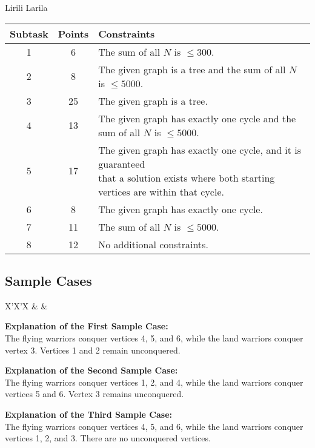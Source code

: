 \begin{statement}[
  problempoints=100,
  timelimit=2 seconds,
  memorylimit=512 MiB,
]{Lirili Larila}
{\renewcommand{\arraystretch}{1.4}
  \setlength{\tabcolsep}{6pt}
  \begin{tabular}{ccl}
   Subtask & Points & Constraints \\ \midrule
    1 & 6 & The sum of all $N$ is $\leq 300$. \\
    2 & 8 & The given graph is a tree and the sum of all $N$ is $\leq 5000$. \\
    3 & 25 & The given graph is a tree. \\
    4 & 13 & The given graph has exactly one cycle and the sum of all $N$ is $\leq 5000$. \\[5pt]
    5 & 17 & \makecell[l]{The given graph has exactly one cycle, and it is guaranteed \\ that a solution exists where both starting vertices are within that cycle.} \\[6pt]
    6 & 8 & The given graph has exactly one cycle. \\
    7 & 11 & The sum of all $N$ is $\leq 5000$. \\
    8 & 12 & No additional constraints. \\
\end{tabular}}

\subsection*{Sample Cases}
\begin{tabularx}{\textwidth}{X'X'X}
 &
 &
\end{tabularx}

\textbf{Explanation of the First Sample Case:} \\
The flying warriors conquer vertices 4, 5, and 6, while the land warriors conquer vertex 3.  
Vertices 1 and 2 remain unconquered.

\textbf{Explanation of the Second Sample Case:} \\
The flying warriors conquer vertices 1, 2, and 4, while the land warriors conquer vertices 5 and 6.  
Vertex 3 remains unconquered.

\textbf{Explanation of the Third Sample Case:} \\
The flying warriors conquer vertices 4, 5, and 6, while the land warriors conquer vertices 1, 2, and 3.  
There are no unconquered vertices.

\end{statement}
